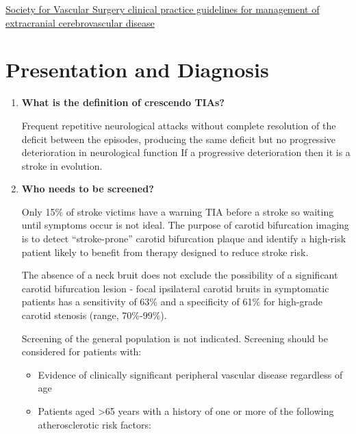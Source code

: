 \documentclass[
]{book}
\begin{document}
\href{https://www.jvascsurg.org/article/S0741-5214(21)00893-4/fulltext}{Society for Vascular Surgery clinical practice guidelines for
management of extracranial cerebrovascular
disease}
\citep{aburahmaSocietyVascularSurgery2022}

\hypertarget{presentation-and-diagnosis}{%
\section{Presentation and Diagnosis}\label{presentation-and-diagnosis}}

\begin{enumerate}
\def\labelenumi{\arabic{enumi}.}
\item
  \textbf{What is the definition of crescendo TIAs?}

  Frequent repetitive neurological attacks without complete resolution
  of the deficit between the episodes, producing the same deficit but
  no progressive deterioration in neurological function If a
  progressive deterioration then it is a stroke in evolution.
\item
  \textbf{Who needs to be screened?}

  Only 15\% of stroke victims have a warning TIA before a stroke so
  waiting until symptoms occur is not ideal. The purpose of carotid
  bifurcation imaging is to detect ``stroke-prone'' carotid bifurcation
  plaque and identify a high-risk patient likely to benefit from
  therapy designed to reduce stroke risk.

  The absence of a neck bruit does not exclude the possibility of a
  significant carotid bifurcation lesion - focal ipsilateral carotid
  bruits in symptomatic patients has a sensitivity of 63\% and a
  specificity of 61\% for high-grade carotid stenosis (range, 70\%-99\%).

  Screening of the general population is not indicated. Screening
  should be considered for patients with:

  \begin{itemize}
  \item
    Evidence of clinically significant peripheral vascular disease
    regardless of age
  \item
    Patients aged \textgreater65 years with a history of one or more of the
    following atherosclerotic risk factors:


\end{itemize}
\end{enumerate}
\end{document}
